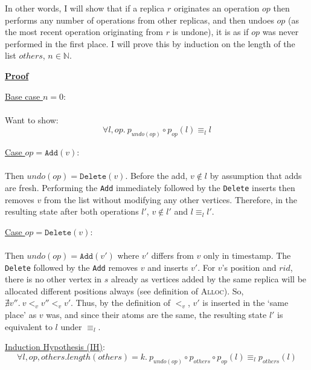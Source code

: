 \documentclass[diss.tex]{subfiles}
\begin{document}
In other words, I will show that if a replica $r$ originates an operation $op$ then performs any number of operations from other replicas, and then undoes $op$ (as the most recent operation originating from $r$ is undone), it is as if $op$ was never performed in the first place. I will prove this by induction on the length of the list $others$, $n \in \mathbb{N}$.

\noindent\underline{\textbf{Proof}}

\noindent\underline{Base case $n=0$}:\\\\
Want to show:
$$\forall l, op. ~p_{undo(op)} \circ p_{op}(l)  \equiv_l l $$


\setlength{\leftskip}{1cm}

\noindent\underline{Case $op=\texttt{Add}(v)$}:\\\\
Then $undo(op) = \texttt{Delete}(v)$. Before the add, $v \notin l$ by assumption that adds are fresh. Performing the \texttt{Add} immediately followed by the \texttt{Delete} inserts then removes $v$ from the list without modifying any other vertices. Therefore, in the resulting state after both operations $l'$, $v \notin l'$ and $l \equiv_l l'$.

\noindent\underline{Case $op=\texttt{Delete}(v)$}:\\\\
Then $undo(op) = \texttt{Add}(v')$ where $v'$ differs from $v$ only in timestamp. The \texttt{Delete} followed by the \texttt{Add} removes $v$ and inserts $v'$. For $v$'s position and $rid$, there is no other vertex in $s$ already as vertices added by the same replica will be allocated different positions always (see definition of \textsc{Alloc}). So, $\nexists v''. ~ v <_v v'' <_v v'$. Thus, by the definition of $<_v$, $v'$ is inserted in the `same place' as $v$ was, and since their atoms are the same, the resulting state $l'$ is equivalent to $l$ under $\equiv_l$.

\setlength{\leftskip}{0cm}




\noindent\underline{Induction Hypothesis (IH)}:
$$\forall l, op, others. length(others) = k.~ p_{undo(op)} \circ p_{others} \circ p_{op}(l)  \equiv_l p_{others}(l) $$


\end{document}
